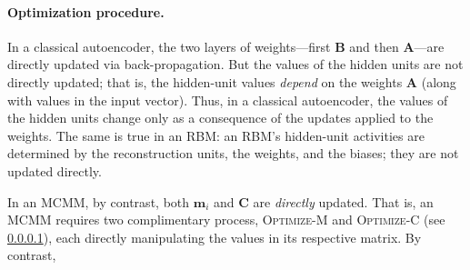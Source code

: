 %
%

\paragraph{Optimization procedure.}  In a classical autoencoder, the two layers of 
weights---first $\textbf{B}$ and then $\textbf{A}$---are directly updated via back-propagation. 
But the values of the hidden units are not directly updated; that is, the hidden-unit values 
\emph{depend} on the weights $\textbf{A}$ (along with values in the input vector). 
Thus, in a classical autoencoder, the values of the hidden units change only as a 
consequence of the updates applied to the weights. The same is true in an RBM: an RBM's hidden-unit activities are determined by
the reconstruction units, the weights, and the biases; they are not updated directly.

In an MCMM, by contrast, both $\textbf{m}_i$ and $\textbf{C}$ are \emph{directly} updated. That is, an MCMM requires two complimentary process, \textsc{Optimize-M} and \textsc{Optimize-C} (see \ref{}), each directly manipulating the values in its respective matrix. By contrast,






